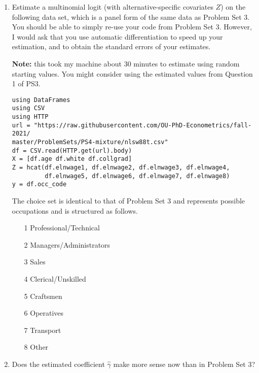 \documentclass[12pt,english]{article}
\begin{document}
\begin{enumerate}
\item Estimate a multinomial logit (with alternative-specific covariates $Z$) on the following data set, which is a panel form of the same data as Problem Set 3. You should be able to simply re-use your code from Problem Set 3. However, I would ask that you use automatic differentiation to speed up your estimation, and to obtain the standard errors of your estimates.

\textbf{Note:} this took my machine about 30 minutes to estimate using random starting values. You might consider using the estimated values from Question 1 of PS3.

\begin{verbatim}
using DataFrames
using CSV
using HTTP
url = "https://raw.githubusercontent.com/OU-PhD-Econometrics/fall-2021/
master/ProblemSets/PS4-mixture/nlsw88t.csv"
df = CSV.read(HTTP.get(url).body)
X = [df.age df.white df.collgrad]
Z = hcat(df.elnwage1, df.elnwage2, df.elnwage3, df.elnwage4, 
         df.elnwage5, df.elnwage6, df.elnwage7, df.elnwage8)
y = df.occ_code
\end{verbatim}

The choice set is identical to that of Problem Set 3 and represents possible occupations and is structured  as follows.

\begin{enumerate}
    \item[1] Professional/Technical 
    \item[2] Managers/Administrators
    \item[3] Sales                  
    \item[4] Clerical/Unskilled     
    \item[5] Craftsmen              
    \item[6] Operatives             
    \item[7] Transport              
    \item[8] Other                  
\end{enumerate}

\item Does the estimated coefficient $\hat{\gamma}$ make more sense now than in Problem Set 3?


\end{enumerate}
\end{document}
